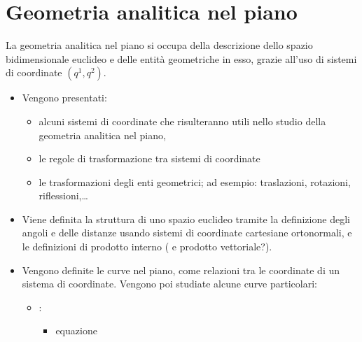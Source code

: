 \documentclass[letterpaper,10pt,english]{jupyterBook}
\begin{document}
\chapter{Geometria analitica nel piano}
\label{\detokenize{ch/analytic_geometry/analytic_geometry_2d:geometria-analitica-nel-piano}}\label{\detokenize{ch/analytic_geometry/analytic_geometry_2d:geometry-analytic-2d}}\label{\detokenize{ch/analytic_geometry/analytic_geometry_2d::doc}}
\sphinxAtStartPar
La geometria analitica nel piano si occupa della descrizione dello spazio bidimensionale euclideo e delle entità geometriche in esso, grazie all’uso di sistemi di coordinate \((q^1, q^2)\).
\begin{itemize}
\item {} 
\sphinxAtStartPar
{} Vengono presentati:
\begin{itemize}
\item {} 
\sphinxAtStartPar
alcuni sistemi di coordinate che risulteranno utili nello studio della geometria analitica nel piano,

\item {} 
\sphinxAtStartPar
le regole di trasformazione tra sistemi di coordinate

\item {} 
\sphinxAtStartPar
le trasformazioni degli enti geometrici; ad esempio: traslazioni, rotazioni, riflessioni,…

\end{itemize}

\item {} 
\sphinxAtStartPar
{} Viene definita la struttura di uno spazio euclideo tramite la definizione degli angoli e delle distanze usando sistemi di coordinate cartesiane ortonormali, e le definizioni di prodotto interno ( e prodotto vettoriale?).

\item {} 
\sphinxAtStartPar
{} Vengono definite le curve nel piano, come relazioni tra le coordinate di un sistema di coordinate.   Vengono poi studiate alcune curve particolari:
\begin{itemize}
\item {} 
\sphinxAtStartPar
{}:
\begin{itemize}
\item {} 
\sphinxAtStartPar
equazione


\end{itemize}
\end{itemize}
\end{itemize}
\end{document}
